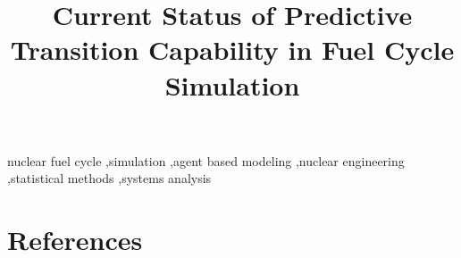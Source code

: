 \documentclass[3p,onecolumn]{elsarticle}
\begin{document}
\begin{frontmatter}

        \title{Current Status of Predictive Transition Capability in Fuel Cycle Simulation}







\begin{keyword}
nuclear fuel cycle \sep simulation \sep agent based modeling \sep nuclear 
        engineering \sep statistical methods \sep systems analysis
\end{keyword}

\end{frontmatter}









\nocite{*}

\section{References}

\end{document}
